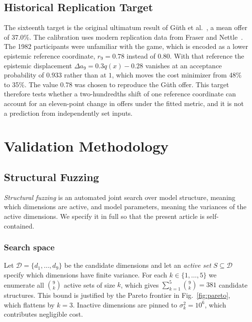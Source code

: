 \documentclass[journal]{IEEEtran}
\begin{document}
\subsection{Historical Replication Target}

The sixteenth target is the original ultimatum result of G\"uth et al.~\cite{guth1982}, a mean offer of 37.0\%.
The calibration uses modern replication data from Fraser and Nettle~\cite{fraser2020}.
The 1982 participants were unfamiliar with the game, which is encoded as a lower epistemic reference coordinate, $r_9=0.78$ instead of $0.80$.
With that reference the epistemic displacement $\Delta a_9=0.3q(x)-0.28$ vanishes at an acceptance probability of $0.933$ rather than at $1$, which moves the cost minimizer from 48\% to 35\%.
The value $0.78$ was chosen to reproduce the G\"uth offer.
This target therefore tests whether a two-hundredths shift of one reference coordinate can account for an eleven-point change in offers under the fitted metric, and it is not a prediction from independently set inputs.


\section{Validation Methodology}
\label{sec:validation}

\subsection{Structural Fuzzing}
\label{sec:fuzzing}

\emph{Structural fuzzing} is an automated joint search over model structure, meaning which dimensions are active, and model parameters, meaning the variances of the active dimensions.
We specify it in full so that the present article is self-contained.

\subsubsection{Search space}
Let $\mathcal{D}=\{d_1,\dots,d_9\}$ be the candidate dimensions and let an \emph{active set} $S\subseteq\mathcal{D}$ specify which dimensions have finite variance.
For each $k\in\{1,\dots,5\}$ we enumerate all $\binom{9}{k}$ active sets of size $k$, which gives $\sum_{k=1}^{5}\binom{9}{k}=381$ candidate structures.
This bound is justified by the Pareto frontier in Fig.~\ref{fig:pareto}, which flattens by $k=3$.
Inactive dimensions are pinned to $\sigma_k^2=10^{6}$, which contributes negligible cost.
\end{document}
